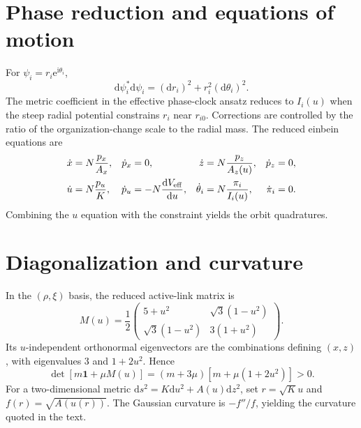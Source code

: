 \documentclass[11pt]{article}
\theoremstyle{plain}
\newcommand{\dd}{\mathrm d}
\newcommand{\e}{\mathrm e}
\begin{document}
\begin{appendices}
\setcounter{figure}{1}%
\renewcommand{\thefigure}{\arabic{figure}}
\setcounter{equation}{0}
\makeatletter
{}
\makeatother
\renewcommand{\theequation}{\thesection\arabic{equation}}
\section{Phase reduction and equations of motion}

For $\psi_i=r_i\e^{\mathrm i\theta_i}$,
\begin{equation}
\dd\psi_i^*\dd\psi_i=(\dd r_i)^2+r_i^2(\dd\theta_i)^2.
\end{equation}
The metric coefficient in the effective phase-clock ansatz reduces to $I_i(u)$ when the steep radial potential constrains $r_i$ near $r_{i0}$. Corrections are controlled by the ratio of the organization-change scale to the radial mass. The reduced einbein equations are
\begin{align}
\dot x&=N\frac{p_x}{A_x},&\dot p_x&=0,&
\dot z&=N\frac{p_z}{A_z(u)},&\dot p_z&=0,\\
\dot u&=N\frac{p_u}{K},&\dot p_u&=-N\frac{\dd V_{\rm eff}}{\dd u},&
\dot\theta_i&=N\frac{\pi_i}{I_i(u)},&\dot\pi_i&=0.
\end{align}
Combining the $u$ equation with the constraint yields the orbit quadratures.

\section{Diagonalization and curvature}

In the $(\rho,\xi)$ basis, the reduced active-link matrix is
\begin{equation}
M(u)=\frac12
\begin{pmatrix}
5+u^2 & \sqrt3(1-u^2)\\
\sqrt3(1-u^2) & 3(1+u^2)
\end{pmatrix}.
\end{equation}
Its $u$-independent orthonormal eigenvectors are the combinations defining $(x,z)$, with eigenvalues $3$ and $1+2u^2$. Hence
\begin{equation}
\det[m\mathbf1+\mu M(u)]=(m+3\mu)[m+\mu(1+2u^2)]>0.
\end{equation}
For a two-dimensional metric $\dd s^2=K\dd u^2+A(u)\dd z^2$, set $r=\sqrt K u$ and $f(r)=\sqrt{A(u(r))}$. The Gaussian curvature is $-f''/f$, yielding the curvature quoted in the text.


\end{appendices}
\end{document}
